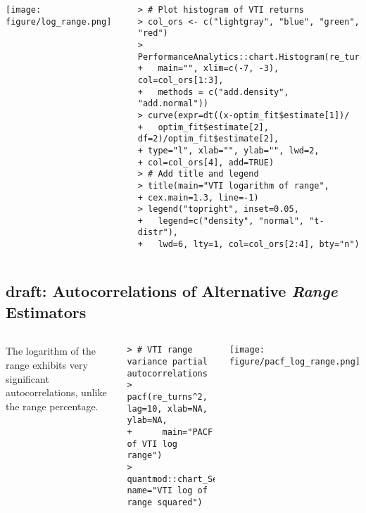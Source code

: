 \documentclass[10pt]{beamer}\usepackage[]{graphicx}\usepackage[]{color}
\makeatletter
\newenvironment{kframe}{%
 \def\at@end@of@kframe{}%
 \ifinner\ifhmode%
  \def\at@end@of@kframe{\end{minipage}}%
  \begin{minipage}{\columnwidth}%
 \fi\fi%
 \def\FrameCommand##1{\hskip\@totalleftmargin \hskip-\fboxsep
 \colorbox{shadecolor}{##1}\hskip-\fboxsep
     \hskip-\linewidth \hskip-\@totalleftmargin \hskip\columnwidth}%
 \MakeFramed {\advance\hsize-\width
   \@totalleftmargin\z@ \linewidth\hsize
   \@setminipage}}%
 {\par\unskip\endMakeFramed%
 \at@end@of@kframe}
\newenvironment{knitrout}{}{} %
\makeatother
\begin{document}
\begin{frame}[fragile,t]{\subsecname}
\begin{block}{}
\begin{columns}[T]
      \texttt{[image: figure/log\_range.png]}
      \vspace{-2em}
\begin{knitrout}\tiny
{}\color{fgcolor}\begin{kframe}
\begin{verbatim}
> # Plot histogram of VTI returns
> col_ors <- c("lightgray", "blue", "green", "red")
> PerformanceAnalytics::chart.Histogram(re_turns,
+   main="", xlim=c(-7, -3), col=col_ors[1:3],
+   methods = c("add.density", "add.normal"))
> curve(expr=dt((x-optim_fit$estimate[1])/
+   optim_fit$estimate[2], df=2)/optim_fit$estimate[2],
+ type="l", xlab="", ylab="", lwd=2,
+ col=col_ors[4], add=TRUE)
> # Add title and legend
> title(main="VTI logarithm of range",
+ cex.main=1.3, line=-1)
> legend("topright", inset=0.05,
+   legend=c("density", "normal", "t-distr"),
+   lwd=6, lty=1, col=col_ors[2:4], bty="n")
\end{verbatim}
\end{kframe}
\end{knitrout}
  \end{columns}
\end{block}

\end{frame}


\subsection{draft: Autocorrelations of Alternative \protect\emph{Range} Estimators}
\begin{frame}[fragile,t]{\subsecname}
\vspace{-1em}
\begin{block}{}
  \begin{columns}[T]
      The logarithm of the range exhibits very significant autocorrelations, unlike the range percentage.
\begin{knitrout}\tiny
{}\color{fgcolor}\begin{kframe}
\begin{verbatim}
> # VTI range variance partial autocorrelations
> pacf(re_turns^2, lag=10, xlab=NA, ylab=NA,
+      main="PACF of VTI log range")
> quantmod::chart_Series(re_turns^2, name="VTI log of range squared")
\end{verbatim}
\end{kframe}
\end{knitrout}
      \texttt{[image: figure/pacf\_log\_range.png]}
  \end{columns}
\end{block}

\end{frame}
\end{document}
